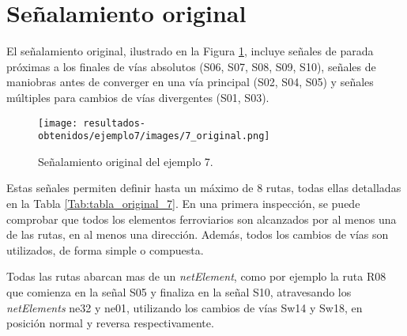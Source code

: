 \section{Señalamiento original}

    El señalamiento original, ilustrado en la Figura \ref{fig:EJ7_2}, incluye señales de parada próximas a los finales de vías absolutos (S06, S07, S08, S09, S10), señales de maniobras antes de converger en una vía principal (S02, S04, S05) y señales múltiples para cambios de vías divergentes (S01, S03).
    
    \begin{figure}[H]
    	\centering
    	\texttt{[image: resultados-obtenidos/ejemplo7/images/7\_original.png]}
    	\centering\caption{Señalamiento original del ejemplo 7.}
    	\label{fig:EJ7_2}
    \end{figure}
    
    Estas señales permiten definir hasta un máximo de 8 rutas, todas ellas detalladas en la Tabla \ref{Tab:tabla_original_7}. En una primera inspección, se puede comprobar que todos los elementos ferroviarios son alcanzados por al menos una de las rutas, en al menos una dirección. Además, todos los cambios de vías son utilizados, de forma simple o compuesta. 
    
    \begin{table}[H]
        {
        \caption{Tabla de enclavamiento original del ejemplo 7.}
        \label{Tab:tabla_original_7}
        \centering
     }
    \end{table}
    
    Todas las rutas abarcan mas de un \textit{netElement}, como por ejemplo la ruta R08 que comienza en la señal S05 y finaliza en la señal S10, atravesando los \textit{netElements} ne32 y ne01, utilizando los cambios de vías Sw14 y Sw18, en posición normal y reversa respectivamente.